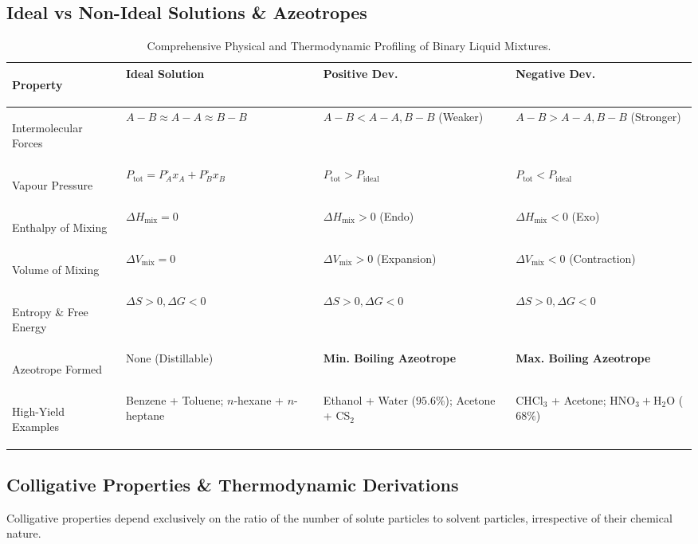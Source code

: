 \documentclass[10pt,twoside,openright]{book}
\begin{document}
\subsection{Ideal vs Non-Ideal Solutions \& Azeotropes}
\begin{table}[htbp]
\centering
\scriptsize
\setlength{\tabcolsep}{2.5pt}
\renewcommand{\arraystretch}{1.2}
\begin{tabularx}{\textwidth}{>{\bfseries\raggedright\arraybackslash}p{2.1cm} L L L}
\toprule
\textbf{Property} & \textbf{Ideal Solution} & \textbf{Positive Dev.} & \textbf{Negative Dev.} \\
\midrule
Intermolecular Forces & $A-B \approx A-A \approx B-B$ & $A-B < A-A, B-B$ (Weaker) & $A-B > A-A, B-B$ (Stronger) \\
Vapour Pressure & $P_{\text{tot}} = P_A^\circ x_A + P_B^\circ x_B$ & $P_{\text{tot}} > P_{\text{ideal}}$ & $P_{\text{tot}} < P_{\text{ideal}}$ \\
Enthalpy of Mixing & $\Delta H_{\text{mix}} = 0$ & $\Delta H_{\text{mix}} > 0$ (Endo) & $\Delta H_{\text{mix}} < 0$ (Exo) \\
Volume of Mixing & $\Delta V_{\text{mix}} = 0$ & $\Delta V_{\text{mix}} > 0$ (Expansion) & $\Delta V_{\text{mix}} < 0$ (Contraction) \\
Entropy \& Free Energy & $\Delta S > 0, \Delta G < 0$ & $\Delta S > 0, \Delta G < 0$ & $\Delta S > 0, \Delta G < 0$ \\
Azeotrope Formed & None (Distillable) & \textbf{Min. Boiling Azeotrope} & \textbf{Max. Boiling Azeotrope} \\
High-Yield Examples & Benzene + Toluene; $n$-hexane + $n$-heptane & Ethanol + Water ($95.6\%$); Acetone + $\mathrm{CS_2}$ & $\mathrm{CHCl_3}$ + Acetone; $\mathrm{HNO_3} + \mathrm{H_2O}$ ($68\%$) \\
\bottomrule
\end{tabularx}
\caption{Comprehensive Physical and Thermodynamic Profiling of Binary Liquid Mixtures.}
\end{table}

\subsection{Colligative Properties \& Thermodynamic Derivations}
Colligative properties depend exclusively on the ratio of the number of solute particles to solvent particles, irrespective of their chemical nature.
\end{document}
